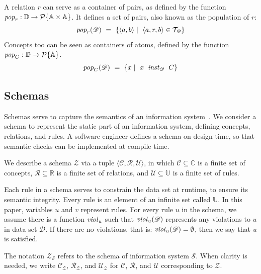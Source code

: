\documentclass[runningheads]{llncs}
\newcommand{\id}[1]{\text{\it #1\/}}
\newcommand{\pop}[2]{\id{pop}_{#1}(#2)}
\newcommand{\instance}{\mathbin{\id{inst}}}
\newcommand{\viol}[2]{\violC{#1}(#2)}
\newcommand{\violC}[1]{\id{viol}_{#1}}
\newcommand{\powerset}[1]{\cal{P}\{#1\}}
\newcommand{\declare}[3]{\id{#1}_{\pair{#2}{#3}}}
\newcommand{\pair}[2]{\langle{#1},{#2}\rangle}
\newcommand{\Pair}[2]{#1\times#2}
\newcommand{\triple}[3]{\langle{#1},{#2},{#3}\rangle}
\newcommand{\Atoms}{\mathbb{A}}
\newcommand{\concepts}{\mathcal{C}}
\newcommand{\Concepts}{\mathbb{C}}
\newcommand{\rels}{\mathcal{R}}   %
\newcommand{\Rels}{\mathbb{R}}   %
\newcommand{\triples}{\mathcal{T}}
\newcommand{\rules}{\mathcal{U}}
\newcommand{\Rules}{\mathbb{U}}
\newcommand{\dataset}{\mathscr{D}}
\newcommand{\Dataset}{\mathbb{D}}
\newcommand{\schema}{\mathscr{Z}}
\newcommand{\infsys}{\mathscr{S}}
\begin{document}
   A relation $r$ can serve as a container of pairs,
   as defined by the function $\id{pop}_r:\Dataset\rightarrow\powerset{\Pair{\Atoms}{\Atoms}}$.
   It defines a set of pairs, also known as the population of $r$:
\begin{equation}
   \pop{r}{\dataset}\ =\ \{ \pair{a}{b}\mid\ \triple{a}{r}{b}\in\triples_{\dataset}\}
\label{eqn:pop-rel}
\end{equation}
%
   Concepts too can be seen as containers of atoms,
   defined by the function $\id{pop}_C:\Dataset\rightarrow\powerset{\Atoms}$.
\begin{equation}
   \pop{C}{\dataset}\ =\ \{ x\mid\ x\ \instance_{\dataset}\ C\}
\label{eqn:pop-concept}
\end{equation}

\subsection{Schemas}
\label{sct:Schemas}
   Schemas serve to capture the semantics of an information system~\cite{Spivak2012}.
   We consider a schema to represent the static part of an information system, defining concepts, relations, and rules.
   A software engineer defines a schema on design time, so that semantic checks can be implemented at compile time.

   We describe a schema $\schema$ via a tuple $\triple{\concepts}{\rels}{\rules}$,
   in which $\concepts\subseteq \Concepts$ is a finite set of concepts,
   $\rels\subseteq \Rels$ is a finite set of relations,
   and $\rules\subseteq \Rules$ is a finite set of rules.
   
   Each rule in a schema serves to constrain the data set at runtime, to ensure its semantic integrity.
   Every rule is an element of an infinite set called $\Rules$.
   In this paper, variables $u$ and $v$ represent rules.
   For every rule $u$ in the schema, we assume there is a function $\violC{u}$ such that $\viol{u}{\dataset}$ represents any violations to $u$ in data set $\dataset$.
   If there are no violations, that is: $\viol{u}{\dataset} = \emptyset{}$, then we say that $u$ is satisfied.
   
   The notation $\schema_{\infsys}$ refers to the schema of information system $\infsys$.
   When clarity is needed, we write $\concepts_{\schema}$, $\rels_{\schema}$, and $\rules_{\schema}$
   for $\concepts$, $\rels$, and $\rules$ corresponding to $\schema$.
\end{document}

